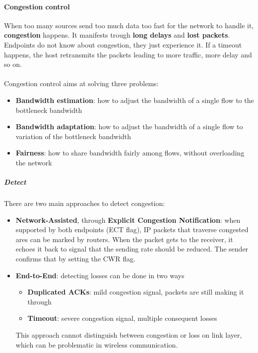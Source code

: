 \paragraph{Congestion control} When too many sources send too much data too fast for the network to handle it, \textbf{congestion} happens. It manifests trough \textbf{long delays} and \textbf{lost packets}.\\
Endpoints do not know about congestion, they just experience it. If a timeout happens, the host retransmits the packets	leading to more traffic, more delay and so on.\\\\
Congestion control aims at solving three problems:
\begin{itemize}
	\item \textbf{Bandwidth estimation}: how to adjust the bandwidth of a single flow to the bottleneck bandwidth
	\item \textbf{Bandwidth adaptation}: how to adjust the bandwidth of a single flow to variation of the bottleneck bandwidth
	\item \textbf{Fairness}: how to share bandwidth fairly among flows, without overloading the network
\end{itemize}

\subparagraph{Detect} There are two main approaches to detect congestion:
\begin{itemize}
	\item \textbf{Network-Assisted}, through \textbf{Explicit Congestion Notification}: when supported by both endpoints (ECT flag), IP packets that traverse congested ares can be marked by routers. When the packet gets to the receiver, it echoes it back to signal that the sending rate should be reduced. The sender confirms that by setting the CWR flag.
	\item \textbf{End-to-End}: detecting losses can be done in two ways
	\begin{itemize}
		\item \textbf{Duplicated ACKs}: mild congestion signal, packets are still making it through
		\item \textbf{Timeout}: severe congestion signal, multiple consequent losses
	\end{itemize}
	This approach cannot distinguish between congestion or loss on link layer, which can be problematic in wireless communication.
\end{itemize}

